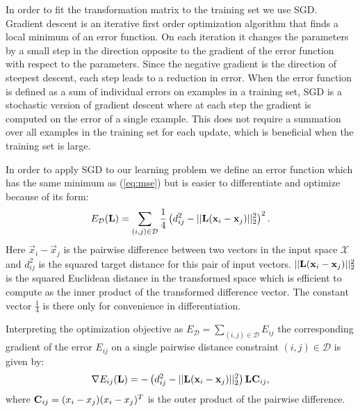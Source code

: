 In order to fit the transformation matrix to the training set we use \acf{SGD}. Gradient descent is an iterative first order optimization algorithm that finds a local minimum of an error function. On each iteration it changes the parameters by a small step in the direction opposite to the gradient of the error function with respect to the parameters. Since the negative gradient is the direction of steepest descent, each step leads to a reduction in error. When the error function is defined as a sum of individual errors on examples in a training set, \ac{SGD} is a stochastic version of gradient descent where at each step the gradient is computed on the error of a single example. This does not require a summation over all examples in the training set for each update, which is beneficial when the training set is large. 

In order to apply \ac{SGD} to our learning problem we define an error function which has the same minimum as (\ref{eq:mse}) but is easier to differentiate and optimize because of its form:
\begin{equation}
E_{\mathcal{D}}(\mathbf{L}) =  \sum_{(i,j) \in \mathcal{D}}  \frac{1}{4} \left ( d_{ij}^2 - ||\mathbf{L}(\mathbf{x}_i - \mathbf{x}_j)||_2^2 \right )^2.
\label{eq:opt_target}
\end{equation}
Here $\vec{x}_i - \vec{x}_j$ is the pairwise difference between two vectors in the input space $\mathcal{X}$ and $d_{ij}^2$ is the squared target distance for this pair of input vectors. $||\mathbf{L}(\mathbf{x}_i - \mathbf{x}_j)||_2^2$ is the squared Euclidean distance in the transformed space which is efficient to compute as the inner product of the transformed difference vector. The constant vector $\frac{1}{4}$ is there only for convenience in differentiation. 

Interpreting the optimization objective as $E_{\mathcal{D}} = \sum_{(i,j)\in\mathcal{D}} E_{ij}$ the corresponding gradient of the error $E_{ij}$ on a single pairwise distance constraint $(i,j) \in \mathcal{D}$ is given by:
\begin{equation}
\nabla E_{ij}(\mathbf{L})  = - \left ( d_{ij}^2 - ||\mathbf{L}(\mathbf{x}_i - \mathbf{x}_j)||_2^2 \right) \mathbf{L} \mathbf{C}_{ij},
\label{eq:opt_grad}
\end{equation}
where $\mathbf{C}_{ij} = (x_i - x_j)(x_i - x_j)^T$ is the outer product of the pairwise difference.

